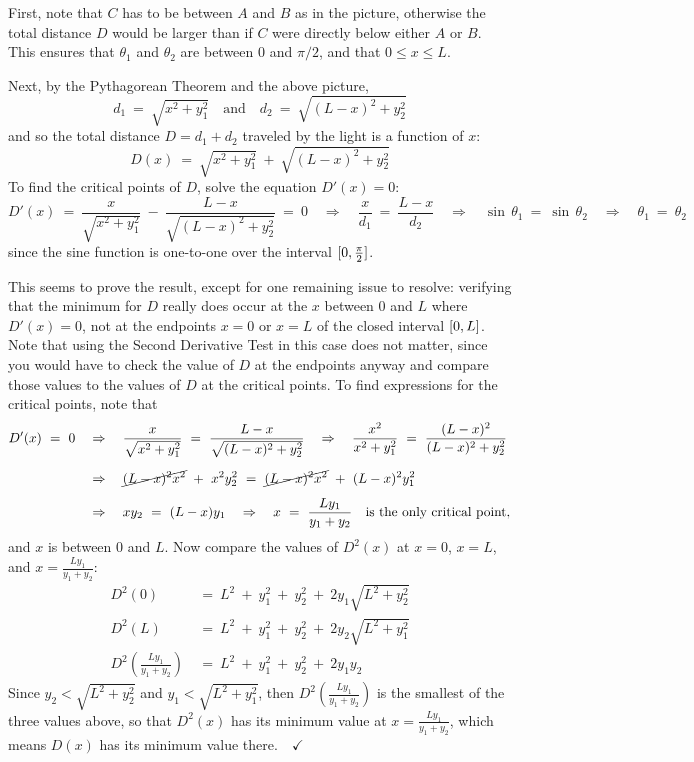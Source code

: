 \begin{exmp}
First, note that $C$ has to be between $A$ and $B$ as in the picture, otherwise
the total distance $D$ would be larger than if $C$ were directly below either
$A$ or $B$. This ensures that $\theta_1$ and $\theta_2$ are between $0$ and
$\pi/2$, and that $0 \le x \le L$.

Next, by the Pythagorean Theorem and the above picture,
\[
d_1 ~=~ \sqrt{x^2 + y_1^2} \quad\text{and}\quad
d_2 ~=~ \sqrt{(L-x)^2 + y_2^2}
\]
and so the total distance $D = d_1 + d_2$ traveled by the light is a function
of $x$:
\[
D(x) ~=~ \sqrt{x^2 + y_1^2} ~+~ \sqrt{(L-x)^2 + y_2^2}
\]
To find the critical points of $D$, solve the equation $D'(x)=0$:
\[
D'(x) ~=~ \frac{x}{\sqrt{x^2 + y_1^2}} ~-~ \frac{L-x}{\sqrt{(L-x)^2 + y_2^2}} ~=~ 0
\quad\Rightarrow\quad \frac{x}{d_1} ~=~ \frac{L-x}{d_2}
\quad\Rightarrow\quad \sin\,\theta_1 ~=~ \sin\,\theta_2
\quad\Rightarrow\quad \theta_1 ~=~ \theta_2
\]
since the sine function is one-to-one over the interval $\lbrack 0,\frac{\pi}{2} \rbrack$.

This seems to prove the result, except for one remaining issue to resolve:
verifying that the minimum for $D$ really does occur at the $x$ between $0$ and
$L$ where $D'(x)=0$, not at the endpoints $x=0$ or $x=L$ of the closed interval
$\lbrack 0,L \rbrack$. Note that using the Second Derivative Test in this case does not
matter, since you would have to check the value of $D$ at the endpoints anyway
and compare those values to the values of $D$ at the critical points. To find
expressions for the critical points, note that
\begin{align*}
D'(x) ~=~ 0 \quad&\Rightarrow\quad
\frac{x}{\sqrt{x^2 + y_1^2}} ~=~ \frac{L-x}{\sqrt{(L-x)^2 + y_2^2}}
\quad\Rightarrow\quad \frac{x^2}{x^2 + y_1^2} ~=~ \frac{(L-x)^2}{(L-x)^2 + y_2^2}\\[6pt]
&\Rightarrow\quad \cancel{(L-x)^2 x^2} ~+~ x^2 y_2^2 ~=~ \cancel{(L-x)^2 x^2} ~+~ (L-x)^2 y_1^2\\[4pt]
&\Rightarrow\quad xy_2 ~=~ (L-x)y_1
\quad\Rightarrow\quad x ~=~ \frac{Ly_1}{y_1 + y_2} \quad\text{is the only critical point,}
\end{align*}
and $x$ is between $0$ and $L$. Now compare the values
of $D^2(x)$ at $x=0$, $x=L$, and $x=\frac{Ly_1}{y_1 + y_2}$:
\begin{align*}
D^2(0) ~&=~ L^2 ~+~ y_1^2 ~+~ y_2^2 ~+~ 2y_1\sqrt{L^2 + y_2^2}\\
D^2(L) ~&=~ L^2 ~+~ y_1^2 ~+~ y_2^2 ~+~ 2y_2\sqrt{L^2 + y_1^2}\\
D^2\left(\tfrac{Ly_1}{y_1 + y_2}\right) ~&=~ L^2 ~+~ y_1^2 ~+~ y_2^2 ~+~ 2y_1y_2
\end{align*}
Since $y_2 < \sqrt{L^2 + y_2^2}$ and $y_1 < \sqrt{L^2 + y_1^2}$, then
$D^2\left(\tfrac{Ly_1}{y_1 + y_2}\right)$ is the smallest of the three values
above, so that $D^2(x)$ has its minimum value at $x=\frac{Ly_1}{y_1 + y_2}$,
which means $D(x)$ has its minimum value there.$\quad\checkmark$
\end{exmp}
